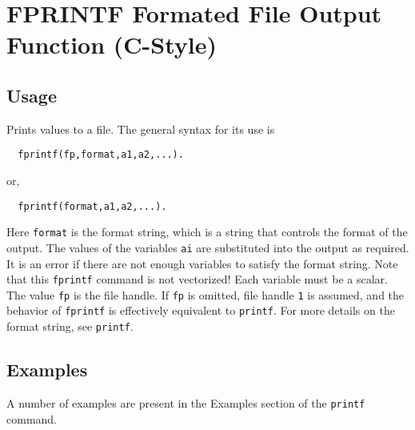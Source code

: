 \section{FPRINTF Formated File Output Function (C-Style)}

\subsection{Usage}

Prints values to a file.  The general syntax for its use is
\begin{verbatim}
  fprintf(fp,format,a1,a2,...).
\end{verbatim}
or, 
\begin{verbatim}
  fprintf(format,a1,a2,...).
\end{verbatim}
Here \verb|format| is the format string, which is a string that
controls the format of the output.  The values of the variables
\verb|ai| are substituted into the output as required.  It is
an error if there are not enough variables to satisfy the format
string.  Note that this \verb|fprintf| command is not vectorized!  Each
variable must be a scalar.  The value \verb|fp| is the file handle.  If \verb|fp| is omitted,
file handle \verb|1| is assumed, and the behavior of \verb|fprintf| is effectively equivalent to \verb|printf|. For
more details on the format string, see \verb|printf|.
\subsection{Examples}

A number of examples are present in the Examples section of the \verb|printf| command.

